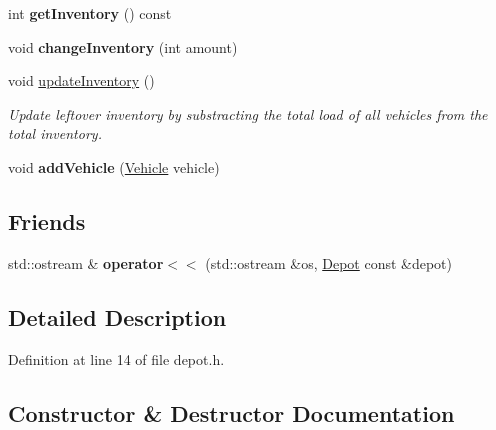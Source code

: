 \begin{DoxyCompactItemize}
\mbox{\label{class_depot_ab8d9a6cba5eb3aa4d860e13435dd64df}} 
int {\bfseries get\+Inventory} () const
\item 
\mbox{\label{class_depot_a91c675fef3c934b87f387050c43f2087}} 
void {\bfseries change\+Inventory} (int amount)
\item 
\mbox{\label{class_depot_aad95f075e3df31cfcb7951d4572265f3}} 
void \hyperlink{class_depot_aad95f075e3df31cfcb7951d4572265f3}{update\+Inventory} ()
\begin{DoxyCompactList}\small\item\em Update leftover inventory by substracting the total load of all vehicles from the total inventory. \end{DoxyCompactList}\item 
\mbox{\label{class_depot_a68e6c378cf4527839c67e8e417560744}} 
void {\bfseries add\+Vehicle} (\hyperlink{class_vehicle}{Vehicle} vehicle)
\end{DoxyCompactItemize}
\subsection*{Friends}
\begin{DoxyCompactItemize}
\item 
\mbox{\label{class_depot_a2b64a812d30d31b49205413ae80a159a}} 
std\+::ostream \& {\bfseries operator$<$$<$} (std\+::ostream \&os, \hyperlink{class_depot}{Depot} const \&depot)
\end{DoxyCompactItemize}


\subsection{Detailed Description}


Definition at line 14 of file depot.\+h.



\subsection{Constructor \& Destructor Documentation}
\mbox{\label{class_depot_ae5be13d5305f06443d8941be30ca5e71}} 
